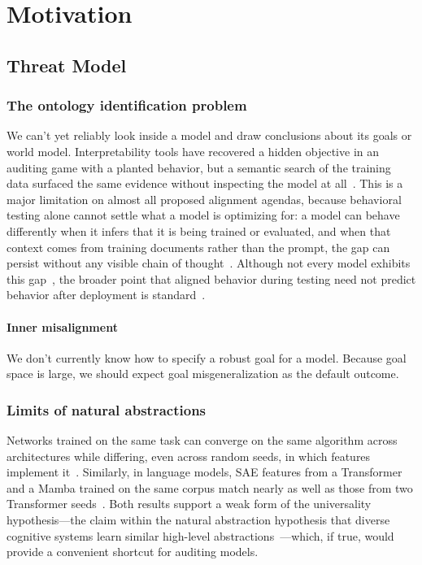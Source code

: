 \section{Motivation}

\subsection{Threat Model}

\subsubsection{The ontology identification problem}
We can't yet reliably look inside a model and draw conclusions about its
goals or world model. Interpretability tools have recovered a hidden
objective in an auditing game with a planted behavior, but a semantic
search of the training data surfaced the same evidence without inspecting
the model at all~\cite{marks2025}. This is a major limitation on almost
all proposed alignment agendas, because behavioral testing alone cannot
settle what a model is optimizing for: a model can behave differently
when it infers that it is being trained or evaluated, and when that
context comes from training documents rather than the prompt, the gap
can persist without any visible chain of thought~\cite{greenblatt2024}.
Although not every model exhibits this gap~\cite{sheshadri2025}, the
broader point that aligned behavior during testing need not predict
behavior after deployment is standard~\cite[Ch.~8]{bostrom2014}.

\paragraph{Inner misalignment}
We don't currently know how to specify a robust goal for a model.
Because goal space is large, we should expect
goal misgeneralization as the default outcome.


\subsubsection{Limits of natural abstractions}
Networks trained on the same task can converge on the same algorithm
across architectures while differing, even across random seeds, in which
features implement it~\cite{chughtai2023}. Similarly, in language models,
SAE features from a Transformer and a Mamba trained on the same corpus
match nearly as well as those from two Transformer seeds~\cite{wang2024}.
Both results support a weak form of the universality hypothesis---the
claim within the natural abstraction hypothesis that diverse cognitive
systems learn similar high-level abstractions~\cite{lang2023}---which,
if true, would provide a convenient shortcut for auditing models.

